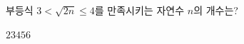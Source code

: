 부등식 $3<\sqrt{2n}\le 4$를 만족시키는 자연수 $n$의 개수는?
\begin{choices32}{$2$}{$3$}{$4$}{$5$}{$6$}\end{choices32}
